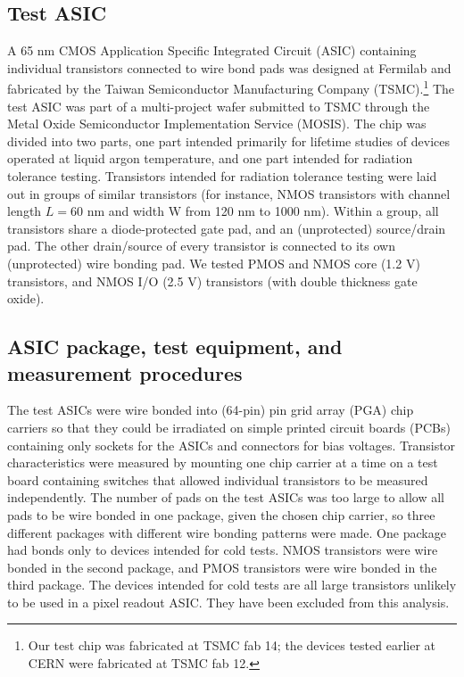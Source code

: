 \subsection{Test ASIC}
\label{ssec2_1}
A 65 nm CMOS Application Specific Integrated Circuit (ASIC) containing individual transistors connected to wire bond pads was designed at Fermilab and fabricated by the Taiwan Semiconductor Manufacturing Company (TSMC)\cite{TSMC}.\footnote{Our test chip was fabricated at TSMC fab 14; the devices tested earlier at CERN were fabricated at TSMC fab 12\cite{SB}.}  The test ASIC was part of a multi-project wafer submitted to TSMC through the Metal Oxide Semiconductor Implementation Service (MOSIS)\cite{MOSIS}.
The chip was divided into two parts, one part intended primarily for lifetime studies of devices operated at liquid argon temperature, and one part intended for radiation tolerance testing.
Transistors intended for radiation tolerance testing were laid out in groups of similar transistors (for instance, NMOS transistors with channel length $L = 60$ nm and width W from 120 nm to 1000 nm). 
Within a group, all transistors share a diode-protected gate pad, and an (unprotected) source/drain pad.  The other drain/source of every transistor is connected to its own (unprotected) wire bonding pad.  We tested PMOS and NMOS core (1.2 V) transistors, and NMOS I/O (2.5 V) transistors (with double thickness gate oxide).

\subsection{ASIC package, test equipment, and measurement procedures}
\label{ssec2_2}

The test ASICs were wire bonded into (64-pin) pin grid array (PGA) chip carriers so that they could be irradiated on simple printed circuit boards (PCBs) containing only sockets for the ASICs and connectors for bias voltages. Transistor characteristics were measured 
by mounting one chip carrier at a time on a test board
containing switches that allowed individual transistors to be measured independently.  The number of pads on the test ASICs was too large to allow all pads to be wire bonded in one package, given the chosen chip carrier, so three different packages with different wire bonding patterns were made.  One package had bonds only to devices intended for cold tests.  NMOS transistors were wire bonded in the second package, and PMOS transistors were wire bonded in the third package.  The devices intended for cold tests are all large transistors unlikely to be used in a pixel readout ASIC.  They have been excluded from this analysis.

